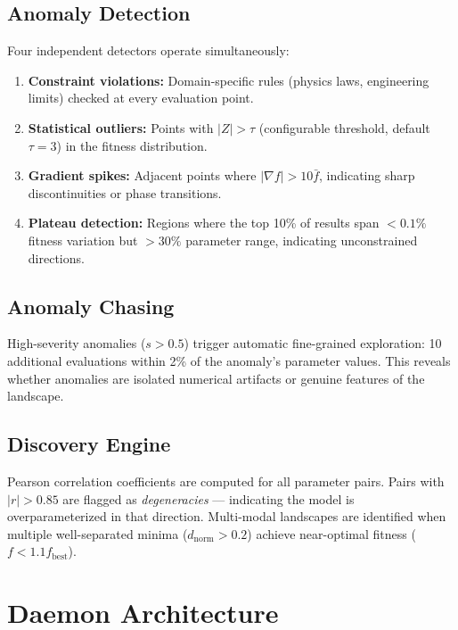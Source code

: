 \documentclass[twocolumn,prd,nofootinbib]{revtex4-2}
\begin{document}
\subsection{Anomaly Detection}\label{sec:anomaly}

Four independent detectors operate simultaneously:

\begin{enumerate}
    \item \textbf{Constraint violations:} Domain-specific rules (physics laws, engineering limits) checked at every evaluation point.
    \item \textbf{Statistical outliers:} Points with $|Z| > \tau$ (configurable threshold, default $\tau = 3$) in the fitness distribution.
    \item \textbf{Gradient spikes:} Adjacent points where $|\nabla f| > 10 \bar{f}$, indicating sharp discontinuities or phase transitions.
    \item \textbf{Plateau detection:} Regions where the top 10\% of results span $<0.1\%$ fitness variation but $>30\%$ parameter range, indicating unconstrained directions.
\end{enumerate}

\subsection{Anomaly Chasing}

High-severity anomalies ($s > 0.5$) trigger automatic fine-grained exploration: 10 additional evaluations within 2\% of the anomaly's parameter values. This reveals whether anomalies are isolated numerical artifacts or genuine features of the landscape.

\subsection{Discovery Engine}

Pearson correlation coefficients are computed for all parameter pairs. Pairs with $|r| > 0.85$ are flagged as \emph{degeneracies} — indicating the model is overparameterized in that direction. Multi-modal landscapes are identified when multiple well-separated minima ($d_\mathrm{norm} > 0.2$) achieve near-optimal fitness ($f < 1.1 f_\mathrm{best}$).

\section{Daemon Architecture}
\end{document}
